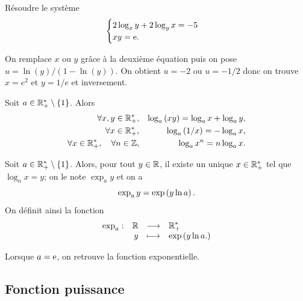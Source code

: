 \documentclass{magnoliaold}
\begin{document}
\begin{exoUnique}
\exo Résoudre le système
  \[\begin{cases}
    2\log_x y+2\log_y x=-5 &\\
    xy={\rm e}. &
    \end{cases}\]
  \begin{sol}
  On remplace $x$ ou $y$ grâce à la deuxième équation puis on pose $u=\ln(y)/(1-\ln(y))$. On obtient $u=-2$ ou $u=-1/2$ donc on trouve $x=e^2$ et $y=1/e$ et inversement.    
  \end{sol}
\end{exoUnique}

\begin{proposition}[utile=-3]
Soit $a\in\mathbb{R}_+^*\setminus\left\{1\right\}$. Alors
\begin{eqnarray*}
\forall x,y\in\mathbb{R}_+^*, & & \log_a \left(xy\right)=\log_a  x+\log_a  y,\\
\forall x\in\mathbb{R}_+^*, & & \log_a \left(1/x\right)=-\log_a  x,\\
\forall x\in\mathbb{R}_+^* ,\quad \forall n\in\mathbb{Z}, & & \log_a  x^n=n\log_a x.
\end{eqnarray*}
\end{proposition}

\begin{definition}[utile=-3]
Soit $a\in\mathbb{R}_+^*\setminus\left\{1\right\}$. Alors, pour tout $y\in\mathbb{R}$, il existe un unique
$x\in\mathbb{R}_+^*$ tel que $\log_a x=y$; on le note $\exp_a y$ et on a
\[\exp_a y=\exp\left(y\ln a\right).\]
On définit ainsi la fonction
\[\begin{array}[t]{lrcl} \displaystyle{\exp_a} : & \displaystyle{\mathbb{R}} & \longrightarrow & \displaystyle{\mathbb{R}_+^*} \\ & \displaystyle{y} & \longmapsto & \displaystyle{\exp\left(y \ln a .\right)} \end{array}\]
\end{definition}

\begin{remarqueUnique}
\remarque Lorsque $a={\rm e}$, on retrouve la fonction exponentielle.  
\end{remarqueUnique}


\subsection{Fonction puissance}
\end{document}

